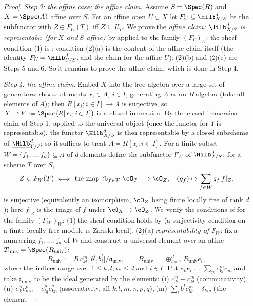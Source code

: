 \begin{proof}
\emph{Step 3: the affine case; the affine claim.}  Assume
$S=\Spec(R)$ and $X=\Spec(A)$ affine over $S$.  For an affine open
$U\subseteq X$ let $F_U\subseteq\Hilb^d_{X/S}$ be the subfunctor with
$Z\in F_U(T)$ iff $Z\subseteq U_T$.  We prove the
\emph{affine claim: $\Hilb^d_{X/S}$ is representable (for $X$ and $S$
affine)} by  applied to the family
$(F_U)_U$: the sheaf condition (1) is ;
condition (2)(a) is the content of the affine claim itself (the
identity $F_U=\Hilb^d_{U/S}$, and the claim for the affine $U$);
(2)(b) and (2)(c) are Steps 5 and 6.  So it remains to prove the
affine claim, which is done in Step 4.

\emph{Step 4: the affine claim.}  Embed $X$ into the free algebra over
a large set of generators: choose elements $x_i\in A$, $i\in I$,
generating $A$ as an $R$-algebra (take all elements of $A$); then
$R[x_i;i\in I]\to A$ is surjective, so $X\to
Y:=\Spec\bigl(R[x_i;i\in I]\bigr)$ is a closed immersion.  By the
closed-immersion claim of Step 1, applied to the universal object
(once the functor for $Y$ is representable), the functor
$\Hilb^d_{X/S}$ is then representable by a closed subscheme of
$\underline{\Hilb}^d_{Y/S}$; so it suffices to treat
$A=R[x_i;i\in I]$.  For a finite subset $W=\{f_1,\dots,f_d\}\subseteq
A$ of $d$ elements define the subfunctor $F_W$ of $\Hilb^d_{X/S}$: for a
scheme $T$ over $S$,
\[
Z\in F_W(T)\ \Longleftrightarrow\ \text{the map }
\oplus_{f\in W}\cO_T\longrightarrow\cO_Z,\quad (g_f)\mapsto
\sum_{f\in W}g_f\,f|_Z ,
\]
is surjective (equivalently an isomorphism, $\cO_Z$ being finite
locally free of rank $d$); here $f|_Z$ is the image of $f$ under
$\cO_X\to\cO_Z$.  We verify the conditions of
 for the family $(F_W)_W$:
(1) the sheaf condition holds by 
(a surjectivity condition on a finite locally free module is
Zariski-local).  (2)(a) \emph{representability of $F_W$}: fix a
numbering $f_1,\dots,f_d$ of $W$ and construct a universal element over
an affine $T_{\mathrm{univ}}=\Spec(R_{\mathrm{univ}})$:
\[
R_{\mathrm{univ}}:=R\bigl[c^m_{kl},b^l,b^l_i\bigr]/\mathfrak a_{\mathrm{univ}} ,
\qquad
B_{\mathrm{univ}}:=\oplus_{l=1}^{d}R_{\mathrm{univ}}e_l ,
\]
where the indices range over $1\le k,l,m\le d$ and $i\in I$.  Put
$e_ke_l:=\sum_mc^m_{kl}e_m$ and take $\mathfrak a_{\mathrm{univ}}$
to be the ideal generated by the elements:
(i) $c^m_{lk}-c^m_{kl}$ (commutativity),
(ii) $c^m_{lk}c^p_{mn}-c^p_{lq}c^q_{kn}$ (associativity, all
$k,l,m,n,p,q$),
(iii) $\sum_lb^lc^m_{lk}-\delta_{km}$ (the element

\end{proof}
